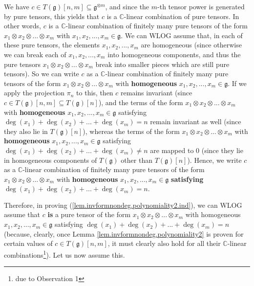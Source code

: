 \documentclass[etingof-lie.tex]{subfiles}
\begin{document}
We have $c\in T\left(  \mathfrak{g}\right)  \left[  n,m\right]  \subseteq
\mathfrak{g}^{\otimes m}$, and since the $m$-th tensor power is generated by
pure tensors, this yields that $c$ is a $\mathbb{C}$-linear combination of
pure tensors. In other words, $c$ is a $\mathbb{C}$-linear combination of
finitely many pure tensors of the form $x_{1}\otimes x_{2}\otimes...\otimes
x_{m}$ with $x_{1},x_{2},...,x_{m}\in\mathfrak{g}$. We can WLOG assume that,
in each of these pure tensors, the elements $x_{1},x_{2},...,x_{m}$ are
homogeneous (since otherwise we can break each of $x_{1},x_{2},...,x_{m}$ into
homogeneous components, and thus the pure tensors $x_{1}\otimes x_{2}%
\otimes...\otimes x_{m}$ break into smaller pieces which are still pure
tensors). So we can write $c$ as a $\mathbb{C}$-linear combination of finitely
many pure tensors of the form $x_{1}\otimes x_{2}\otimes...\otimes x_{m}$ with
\textbf{homogeneous }$x_{1},x_{2},...,x_{m}\in\mathfrak{g}$. If we apply the
projection $\pi_{n}$ to this, then $c$ remains invariant (since $c\in T\left(
\mathfrak{g}\right)  \left[  n,m\right]  \subseteq T\left(  \mathfrak{g}%
\right)  \left[  n\right]  $), and the terms of the form $x_{1}\otimes
x_{2}\otimes...\otimes x_{m}$ with \textbf{homogeneous }$x_{1},x_{2}%
,...,x_{m}\in\mathfrak{g}$ satisfying $\deg\left(  x_{1}\right)  +\deg\left(
x_{2}\right)  +...+\deg\left(  x_{m}\right)  =n$ remain invariant as well
(since they also lie in $T\left(  \mathfrak{g}\right)  \left[  n\right]  $),
whereas the terms of the form $x_{1}\otimes x_{2}\otimes...\otimes x_{m}$ with
\textbf{homogeneous }$x_{1},x_{2},...,x_{m}\in\mathfrak{g}$ satisfying
$\deg\left(  x_{1}\right)  +\deg\left(  x_{2}\right)  +...+\deg\left(
x_{m}\right)  \neq n$ are mapped to $0$ (since they lie in homogeneous
components of $T\left(  \mathfrak{g}\right)  $ other than $T\left(
\mathfrak{g}\right)  \left[  n\right]  $). Hence, we write $c$ as a
$\mathbb{C}$-linear combination of finitely many pure tensors of the form
$x_{1}\otimes x_{2}\otimes...\otimes x_{m}$ with \textbf{homogeneous }%
$x_{1},x_{2},...,x_{m}\in\mathfrak{g}$ \textbf{satisfying} $\deg\left(
x_{1}\right)  +\deg\left(  x_{2}\right)  +...+\deg\left(  x_{m}\right)  =n$.

Therefore, in proving (\ref{lem.invformnondeg.polynomiality2.ind}), we can
WLOG assume that $c$ \textbf{is} a pure tensor of the form $x_{1}\otimes
x_{2}\otimes...\otimes x_{m}$ with homogeneous $x_{1},x_{2},...,x_{m}%
\in\mathfrak{g}$ satisfying $\deg\left(  x_{1}\right)  +\deg\left(
x_{2}\right)  +...+\deg\left(  x_{m}\right)  =n$ (because, clearly, once Lemma
\ref{lem.invformnondeg.polynomiality2} is proven for certain values of $c\in
T\left(  \mathfrak{g}\right)  \left[  n,m\right]  $, it must clearly also hold
for all their $\mathbb{C}$-linear combinations\footnote{due to Observation
1}). Let us now assume this.
\end{document}
